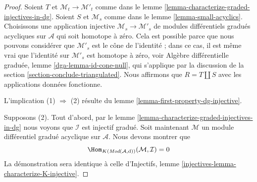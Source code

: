 \begin{proof}
Soient $T$ et $\mathcal{M}_t \to \mathcal{M}'_t$ comme dans le
lemme \ref{lemma-characterize-graded-injectives-in-dg}. Soient
$S$ et $\mathcal{M}_s$ comme dans le lemme
\ref{lemma-small-acyclics}. Choisissons
une application injective $\mathcal{M}_s \to \mathcal{M}'_s$
de modules différentiels gradués acycliques sur $\mathcal{A}$
qui soit homotope à zéro. Cela est possible parce que nous
pouvons considérer que $\mathcal{M}'_s$ est le cône de l'identité ;
dans ce cas, il est même vrai que l'identité sur
$\mathcal{M}'_s$ est homotope à zéro, voir Algèbre
différentielle graduée, lemme \ref{dga-lemma-id-cone-null}, qui s'applique
par la discussion de la section \ref{section-conclude-triangulated}. Nous affirmons
que $R = T \coprod S$ avec les applications données fonctionne.

\medskip\noindent
L'implication (1) $\Rightarrow$ (2) résulte du
lemme \ref{lemma-first-property-dg-injective}.

\medskip\noindent
Supposons (2). Tout d'abord, par le lemme \ref{lemma-characterize-graded-injectives-in-dg}
nous voyons que $\mathcal{I}$ est injectif gradué.
Soit maintenant $\mathcal{M}$ un module différentiel gradué acyclique sur $\mathcal{A}$.
Nous
devons montrer que $$
\Hom_{K(\textit{Mod}(\mathcal{A}, \text{d}))}(\mathcal{M}, \mathcal{I})
= 0 $$
La démonstration sera identique à celle
d'Injectifs, lemme \ref{injectives-lemma-characterize-K-injective}.


\end{proof}

